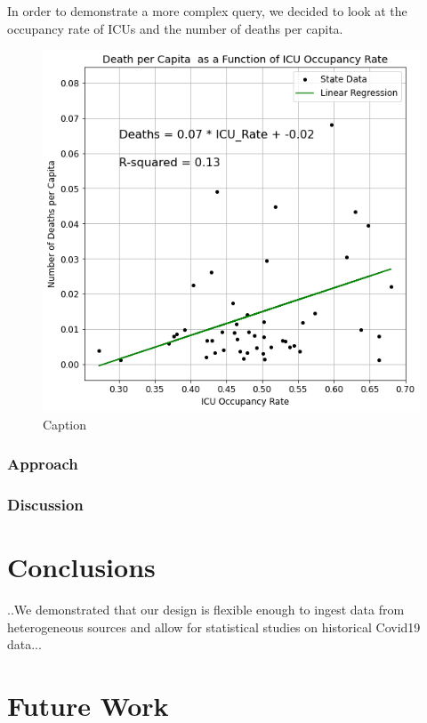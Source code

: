 \documentclass[11pt]{article}
\begin{document}
\noindent
In order to demonstrate a more complex query, we decided to look at the occupancy rate of ICUs and the number of deaths per capita.
\begin{figure}[h]
    \centering
    \includegraphics[width=\textwidth]{diagrams/analysis/death_icu.png}
    \caption{Caption}
    \label{fig:my_label}
\end{figure}

\subsubsection{Approach}


\subsubsection{Discussion}

\pagebreak

\section{Conclusions}
..We demonstrated that our design is flexible enough to ingest data from heterogeneous sources and allow for statistical studies on historical Covid19 data...
\section{Future Work}


\end{document}
